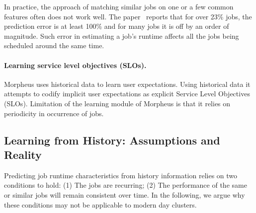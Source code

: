 In practice, the approach of matching similar jobs on 
one or a few common features often does not work well.  The
paper~\cite{3Sigma} reports that for over 23\% jobs, the prediction
error is at least 100\% and for many jobs it is off by an order of
magnitude. Such error in estimating a job's
runtime affects all the jobs being scheduled around the same
time.


\paragraph{Learning service level objectives (SLOs).} Morpheus \cite{morpheus}
uses historical data to learn user expectations. Using historical data it
attempts to codify implicit user expectations as explicit Service Level
Objectives (SLOs). Limitation of the learning module of Morpheus is that it
relies on periodicity in occurrence of jobs.
\fi




\subsection{Learning from History: Assumptions and Reality}
\label{sec:back:whatsWrong}

Predicting job runtime characteristics from history information relies on two
conditions to hold: (1) The jobs are recurring; (2) The performance of
the same {or similar} jobs
will remain consistent over time.  In the following, we argue why these
conditions may not be applicable to modern day clusters.

